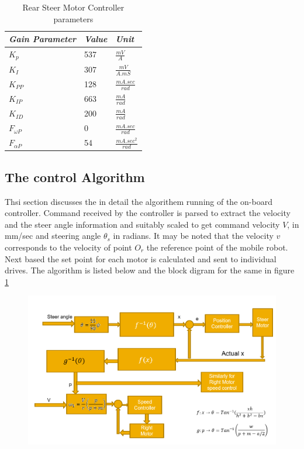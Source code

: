 \begin{table}[!htbp]
	\caption{ Rear Steer Motor Controller  parameters }
	\label{tb:steer}
	\centering
	\begin{tabular}{l l l}
		\hline
		\emph{Gain Parameter}  & \emph{ Value} & \emph{Unit} \\
		\hline
		$K_p$  & 537 &  $\frac{mV}{A}$ \\ 
		$K_I $ & 307 & $\frac{mV}{A.mS}$ \\
		$K_{PP}$& 128 & $ \frac{mA.sec}{rad}$\\
		$K_{IP}$&663&$\frac{mA}{rad}$\\
		$K_{ID}$&200&$\frac{mA}{rad}$\\
		$F_{\omega P}$& 0& $ \frac{mA.sec}{rad}$\\
		$F_{\alpha P}$& 54& $ \frac{mA.sec^2}{rad}$\\
		\hline
	\end{tabular}
\end{table}
\subsection{The control Algorithm}
Thsi section discusses the in detail the algorithem running of the on-board controller.  Command received by the controller is parsed to extract the velocity  and the steer angle  information and suitably scaled to get command velocity  $V$, in mm/sec and steering  angle $\theta_s$ in radians.  It may be noted that the velocity $v$ corresponds to the velocity of point $O_r$ the reference point of the mobile robot.  Next based the set point for each motor is calculated  and sent to individual drives. The algorithm is listed below and the block digram for the same in figure \ref{fig:ControlBlock}
\begin{figure}
	\includegraphics[width=\linewidth,keepaspectratio]{Chapter5/fig/BlkDigLocal}
	\label{fig:ControlBlock} 
\end{figure}


